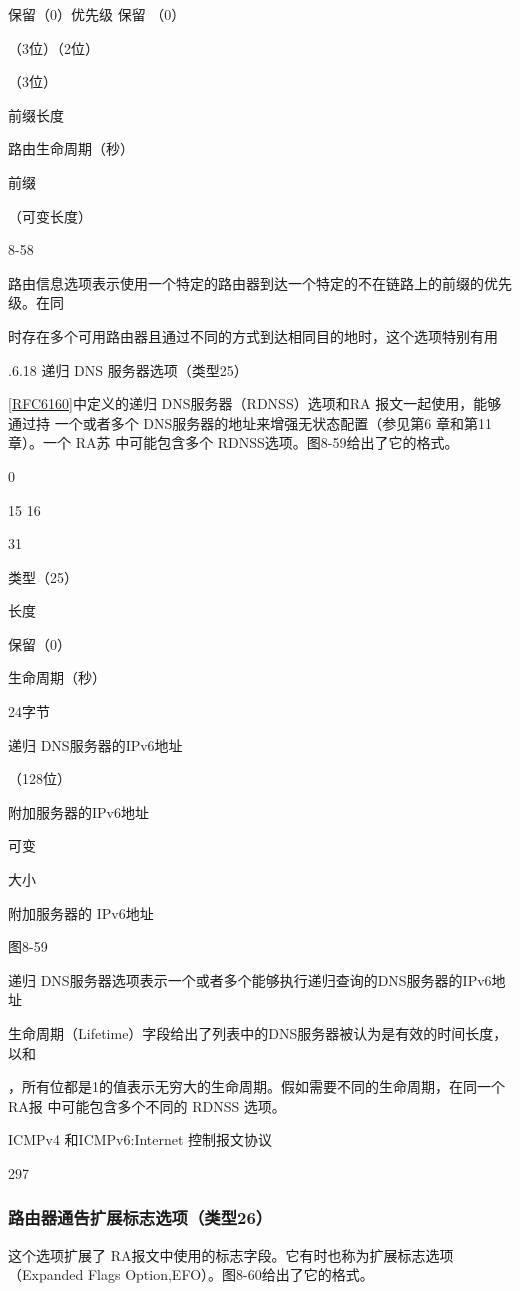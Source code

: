 保留（0）优先级 保留 （0）

（3位）（2位）

（3位）

前缀长度

路由生命周期（秒）

前缀

（可变长度）

8-58

路由信息选项表示使用一个特定的路由器到达一个特定的不在链路上的前缀的优先级。在同

时存在多个可用路由器且通过不同的方式到达相同目的地时，这个选项特别有用

.6.18 递归 DNS 服务器选项（类型25）

\href{https://www.rfc-editor.org/rfc/rfc6160}{[RFC6160]}中定义的递归 DNS服务器（RDNSS）选项和RA 报文一起使用，能够通过持
一个或者多个 DNS服务器的地址来增强无状态配置（参见第6 章和第11章）。一个 RA苏
中可能包含多个 RDNSS选项。图8-59给出了它的格式。

0

15 16

31

类型（25）

长度

保留（0）

生命周期（秒）

24字节

递归 DNS服务器的IPv6地址

（128位）

附加服务器的IPv6地址

可变

大小

附加服务器的 IPv6地址

图8-59

递归 DNS服务器选项表示一个或者多个能够执行递归查询的DNS服务器的IPv6地址

生命周期（Lifetime）字段给出了列表中的DNS服务器被认为是有效的时间长度，以和

，所有位都是1的值表示无穷大的生命周期。假如需要不同的生命周期，在同一个RA报
中可能包含多个不同的 RDNSS 选项。

ICMPv4 和ICMPv6:Internet 控制报文协议

297

\subsubsection{路由器通告扩展标志选项（类型26）}
这个选项扩展了 RA报文中使用的标志字段。它有时也称为扩展标志选项（Expanded
Flags Option,EFO）。图8-60给出了它的格式。


